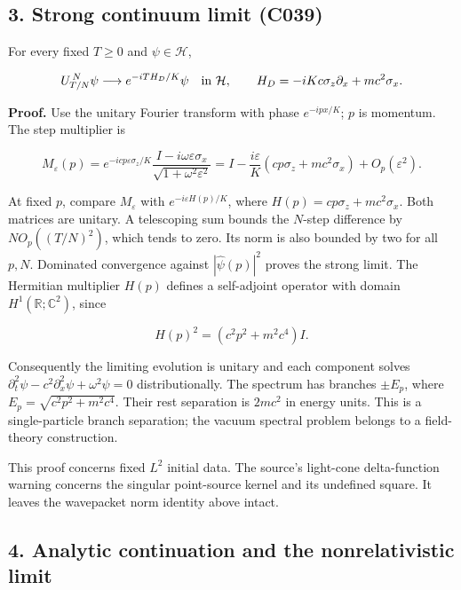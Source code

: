 \documentclass[11pt,a4paper]{article}
\begin{document}
\hypertarget{strong-continuum-limit-c039}{%
\subsection{3. Strong continuum limit
(C039)}\label{strong-continuum-limit-c039}}

For every fixed \(T\ge0\) and \(\psi\in\mathcal H\),

\[
U_{T/N}^{\,N}\psi\longrightarrow e^{-iTH_D/K}\psi
\quad\hbox{in }\mathcal H,\qquad
H_D=-iKc\sigma_z\partial_x+mc^2\sigma_x.
\]

\textbf{Proof.} Use the unitary Fourier transform with phase
\(e^{-ipx/K}\); \(p\) is momentum. The step multiplier is

\[
M_\varepsilon(p)=e^{-icp\varepsilon\sigma_z/K}
\frac{I-i\omega\varepsilon\sigma_x}{\sqrt{1+\omega^2\varepsilon^2}}
=I-\frac{i\varepsilon}{K}(cp\sigma_z+mc^2\sigma_x)
+O_p(\varepsilon^2).
\]

At fixed \(p\), compare \(M_\varepsilon\) with
\(e^{-i\varepsilon H(p)/K}\), where \(H(p)=cp\sigma_z+mc^2\sigma_x\).
Both matrices are unitary. A telescoping sum bounds the \(N\)-step
difference by \(N O_p((T/N)^2)\), which tends to zero. Its norm is also
bounded by two for all \(p,N\). Dominated convergence against
\(|\widehat\psi(p)|^2\) proves the strong limit. The Hermitian
multiplier \(H(p)\) defines a self-adjoint operator with domain
\(H^1(\mathbb R;\mathbb C^2)\), since

\[
H(p)^2=(c^2p^2+m^2c^4)I.
\]

Consequently the limiting evolution is unitary and each component solves
\(\partial_t^2\psi-c^2\partial_x^2\psi+\omega^2\psi=0\)
distributionally. The spectrum has branches \(\pm E_p\), where
\(E_p=\sqrt{c^2p^2+m^2c^4}\). Their rest separation is \(2mc^2\) in
energy units. This is a single-particle branch separation; the vacuum
spectral problem belongs to a field-theory construction.

This proof concerns fixed \(L^2\) initial data. The source's light-cone
delta-function warning concerns the singular point-source kernel and its
undefined square. It leaves the wavepacket norm identity above intact.

\hypertarget{analytic-continuation-and-the-nonrelativistic-limit}{%
\subsection{4. Analytic continuation and the nonrelativistic
limit}\label{analytic-continuation-and-the-nonrelativistic-limit}}
\end{document}
